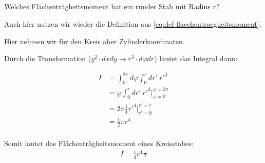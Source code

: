 \subsection{}

\begin{tcolorbox}
    Welches Flächenträgheitsmoment hat ein runder Stab mit Radius $r$?
\end{tcolorbox}

\noindent Auch hier nutzen wir wieder die Definition aus \autoref{eq:def-flaechentraegheitsmoment}.

\noindent Hier nehmen wir für den Kreis aber Zylinderkoordinaten.

Durch die Transformation ($y^{2} \cdot dxdy \to r^{3} \cdot d\varphi dr$) lautet das Integral dann:

\begin{align*}
    I &= \int_{0}^{2 \pi} d\varphi \int_{0}^{r} dr' ~ r'^{3} \\
    &= \varphi \int_{0}^{r} dr' ~ r'^{3} \bigg|_{\varphi = 0}^{\varphi = 2\pi} \\
    &= 2\pi \frac{1}{4} r'^{4} \bigg|_{r' = 0}^{r'=r} \\
    &= \frac{1}{2}\pi r^{4} \\
\end{align*}

\begin{tcolorbox}[result]
    Somit lautet das Flächenträgheitsmoment eines Kreisstabes:
    \begin{align*}
    I = \frac{1}{4} r^{4} \pi
    \end{align*}
\end{tcolorbox}

